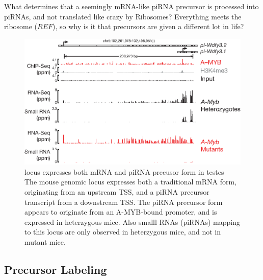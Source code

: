     What determines that a seemingly mRNA-like piRNA precursor is processed into piRNAs, and not translated like crazy by Ribosomes?  Everything meets the ribosome ($REF$), so why is it that precursors are given a different lot in life?

    \begin{figure} %
      \centering 
      \includegraphics{Figures/Discussion/pi-wdfy3.eps}
      \caption[\wdfy{} locus expresses both mRNA and piRNA precusor form in testes]
      {\wdfy{} locus expresses both mRNA and piRNA precusor form in testes\\[0.25cm]
        The mouse genomic locus \wdfy{} expresses both a traditional mRNA form, originating from an upstream TSS, and a piRNA precursor transcript from a downstream TSS. The piRNA precursor form appears to originate from an A-MYB-bound promoter, and is expressed in \amyb{} heterzygous mice. Also smalll RNAs (piRNAs) mapping to this locus are only observed in \amyb{} heterzygous mice, and not in \amyb{} mutant mice.
        }
      \label{Disc:fig:wdfy3}
      \end{figure}


  \subsection{Precursor Labeling}
    \label{Disc:subsec:Labeling of precursors}


